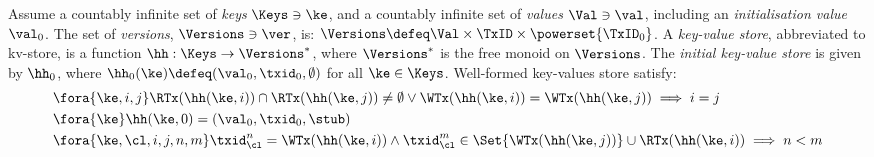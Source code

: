 \begin{definition}
\label{def:mkvs-appendix}
Assume a countably infinite set of \emph{keys} $\Keys \ni \ke$, 
and a countably infinite set of  \emph{values} $\Val \ni \val$, 
including an \emph{initialisation value} $\val_0 $.
The set of \emph{versions}, $\Versions \ni \ver$, is: $\Versions \defeq \Val \times \TxID \times \powerset{\TxID_{0}}$. 
A \emph{key-value store}, abbreviated to kv-store,  is a function $\hh: \Keys \rightarrow \Versions^{\ast}$, 
where $\Versions^{\ast}$ is the free monoid on $\Versions$. 
The \emph{initial key-value store} is given by $\hh_0$, where 
$\hh_{0}(\ke)\defeq  (\val_0, \txid_0, \emptyset)$ for
all $\ke \in \Keys$.
Well-formed key-values store satisfy:
\begin{align}
& \fora{\ke, i, j} 
\RTx(\hh(\ke, i)) \cap \RTx(\hh(\ke, j)) \neq \emptyset \lor
\WTx(\hh(\ke, i)) = \WTx(\hh(\ke, j))
\implies i = j  \\
& \fora{\ke} \hh(\ke, 0) = (\val_0, \txid_0, \stub) \\
& \fora{ \ke, \cl, i,j, n, m} 
\txid_{\cl}^{n} = \WTx(\hh(\ke,i)) \wedge \txid_{\cl}^{m} \in
\Set{\WTx(\hh(\ke,j))} \cup \RTx(\hh(\ke, i)) \implies n < m
\end{align}
\end{definition}



